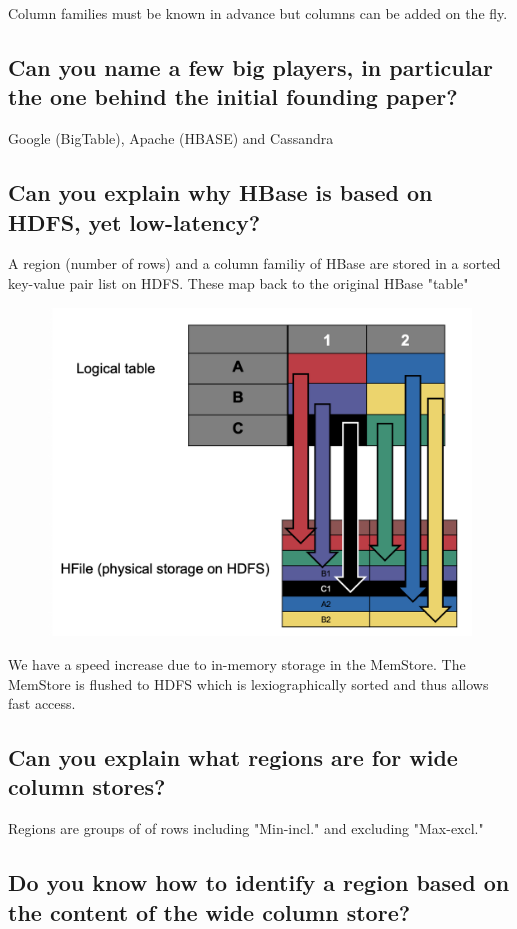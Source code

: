 \documentclass{article}
\begin{document}
Column families must be known in advance but columns can be added on the fly.

\subsection{Can you name a few big players, in particular the one behind the initial founding paper?}

Google (BigTable), Apache (HBASE) and Cassandra

\subsection{Can you explain why HBase is based on HDFS, yet low-latency?}

A region (number of rows) and a column familiy of HBase are stored in a sorted key-value pair list on HDFS. These map back to the original HBase "table"

\begin{figure}[H]
    \centering
    \includegraphics[width=0.5\linewidth]{img/hfile_map.png}
\end{figure}

We have a speed increase due to in-memory storage in the MemStore. The MemStore is flushed to HDFS which is lexiographically sorted and thus allows fast access. 

\subsection{Can you explain what regions are for wide column stores?}

{Regions are groups of of rows including "Min-incl." and excluding "Max-excl."}

\subsection{Do you know how to identify a region based on the content of the wide column store?}
\end{document}
